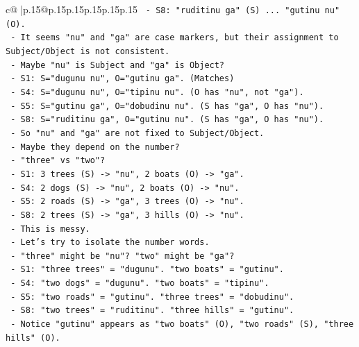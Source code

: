 \documentclass{article}
\begin{document}
{\begin{supertabular}{c@{$\;$}|p{.15\linewidth}@{}p{.15\linewidth}p{.15\linewidth}p{.15\linewidth}p{.15\linewidth}p{.15\linewidth}}
{{{\texttt{            {-} S8: "ruditinu ga" (S) ... "gutinu nu" (O).} \\
\texttt{            {-} It seems "nu" and "ga" are case markers, but their assignment to Subject/Object is not consistent.} \\
\texttt{            {-} Maybe "nu" is Subject and "ga" is Object?} \\
\texttt{              {-} S1: S="dugunu nu", O="gutinu ga". (Matches)} \\
\texttt{              {-} S4: S="dugunu nu", O="tipinu nu". (O has "nu", not "ga").} \\
\texttt{              {-} S5: S="gutinu ga", O="dobudinu nu". (S has "ga", O has "nu").} \\
\texttt{              {-} S8: S="ruditinu ga", O="gutinu nu". (S has "ga", O has "nu").} \\
\texttt{            {-} So "nu" and "ga" are not fixed to Subject/Object.} \\
\texttt{            {-} Maybe they depend on the number?} \\
\texttt{              {-} "three" vs "two"?} \\
\texttt{              {-} S1: 3 trees (S) {-}> "nu", 2 boats (O) {-}> "ga".} \\
\texttt{              {-} S4: 2 dogs (S) {-}> "nu", 2 boats (O) {-}> "nu".} \\
\texttt{              {-} S5: 2 roads (S) {-}> "ga", 3 trees (O) {-}> "nu".} \\
\texttt{              {-} S8: 2 trees (S) {-}> "ga", 3 hills (O) {-}> "nu".} \\
\texttt{            {-} This is messy.} \\
\texttt{            {-} Let's try to isolate the number words.} \\
\texttt{            {-} "three" might be "nu"? "two" might be "ga"?} \\
\texttt{            {-} S1: "three trees" = "dugunu". "two boats" = "gutinu".} \\
\texttt{            {-} S4: "two dogs" = "dugunu". "two boats" = "tipinu".} \\
\texttt{            {-} S5: "two roads" = "gutinu". "three trees" = "dobudinu".} \\
\texttt{            {-} S8: "two trees" = "ruditinu". "three hills" = "gutinu".} \\
\texttt{            {-} Notice "gutinu" appears as "two boats" (O), "two roads" (S), "three hills" (O).} \\
}}}
\end{supertabular}}
\end{document}
